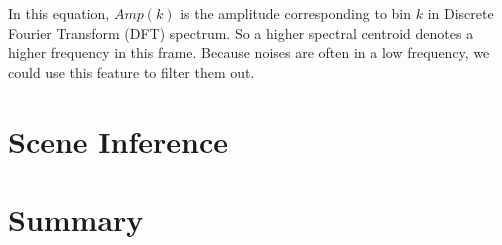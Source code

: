 In this equation, $Amp(k)$ is the amplitude corresponding to bin $k$ in Discrete Fourier Transform (DFT) spectrum. 
So a higher spectral centroid denotes a higher frequency in this frame. Because noises are often in a low frequency, we could use this feature to filter them out. 

\section{Scene Inference}

\section{Summary}
